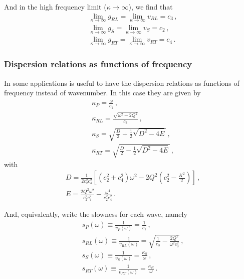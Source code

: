 \documentclass[12pt]{article}
\begin{document}
And in the high frequency limit (\(\kappa \rightarrow \infty\)), we find that
\begin{align*}
&\lim_{\kappa \rightarrow \infty}g_{RL} = \lim_{\kappa \rightarrow \infty}v_{RL} = c_3\, ,\\
&\lim_{\kappa \rightarrow \infty}g_S = \lim_{\kappa \rightarrow \infty}v_S = c_2\, ,\\
&\lim_{\kappa \rightarrow \infty}g_{RT} = \lim_{\kappa \rightarrow \infty}v_{RT} = c_4\, .
\end{align*}

\subsubsection{Dispersion relations as functions of frequency}
In some applications is useful to have the dispersion relations as functions of frequency instead of wavenumber. In this case they are given by
\begin{align}
&\kappa_P = \frac{\omega}{c_1}\, ,\\
&\kappa_{RL} = \frac{\sqrt{\omega^2 - 2Q^2}}{c_3}\, ,\\
&\kappa_S = \sqrt{\frac{D}{2} + \frac{1}{2} \sqrt{D^2 - 4E}}\, ,\\
&\kappa_{RT} = \sqrt{\frac{D}{2} - \frac{1}{2} \sqrt{D^2 - 4E}}\, ,
\end{align}
with
\begin{align*}
&D = \frac{1}{2c_2^2 c_4^2}\left[(c_2^2 + c_4^2)\omega^2 - 2Q^2\left(c_2^2 - \frac{K^2}{2}\right)\right]\, ,\\
&E = \frac{2Q^2 \omega^2}{c_2^2 c_4^2} - \frac{\omega^4}{c_2^2 c_4^2}\, .
\end{align*}

And, equivalently, write the slowness for each wave, namely
\begin{align}
&s_P(\omega) \equiv \frac{1}{v_P(\omega)} = \frac{1}{c_1}\, ,\\
&s_{RL}(\omega) \equiv \frac{1}{v_{RL}(\omega)} = \sqrt{\frac{1}{c_3} - \frac{2Q^2}{\omega^2 c_3^2}}\, ,\\
&s_S(\omega)\equiv \frac{1}{v_S(\omega)} = \frac{\kappa_S}{\omega}\, ,\\
&s_{RT}(\omega) \equiv \frac{1}{v_{RT}(\omega)} = \frac{\kappa_R}{\omega}\, .
\end{align}
\end{document}
